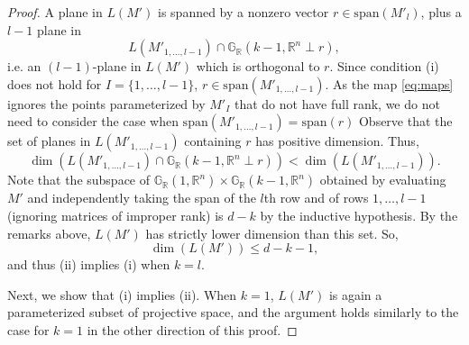 \documentclass[11pt]{article}
\newcommand{\R}{\mathbb{R}}
\newcommand{\Grall}{\mathbb{G}_{\R}}
\renewcommand\vec[1]{\overrightarrow{#1}}
\theoremstyle{remark}
\theoremstyle{definition}
\begin{document}
\begin{appendices}
\begin{proof}
A plane in $L(M')$ is spanned by a nonzero vector $r \in  \mathrm{span}(M'_{l})$, plus a $l-1$ plane in
\begin{displaymath}
L(M'_{1,\dots,l-1}) \cap \Grall(k-1, \mathbb{R}^n \perp r),
\end{displaymath}
i.e.  an $(l-1)$-plane in $L(M')$ which is orthogonal to $r$.
Since condition (i) does not hold for $I = \{1,\dots,l-1\}$, $r \in \mathrm{span}(M'_{1, \dots, l-1})$. As the map \eqref{eq:maps} ignores the points parameterized by $M'_I$ that do not have full rank, we do not need to consider the case when $\mathrm{span}(M'_{1,\dots,l-1}) = \mathrm{span}(r)$ Observe that  the set of planes in $L(M'_{1,\dots,l-1})$ containing $r$ has positive dimension.
Thus,
% 
\begin{displaymath}
\dim(L(M'_{1,\dots,l-1}) \cap \Grall(k-1, \mathbb{R}^n \perp r)) < \dim(L(M'_{1,\dots,l-1})). 
\end{displaymath}
%
\noindent
Note that the subspace of $\Grall(1,\mathbb{R}^n) \times \Grall(k-1, \mathbb{R}^n)$ obtained by evaluating $M'$ and independently taking the span of the $l$th row and of rows $1, \dots, l-1$ (ignoring matrices of improper rank) is $d-k$ by the inductive hypothesis. By the remarks above, $L(M')$ has strictly lower dimension than this set. So,
%
\begin{displaymath}
\dim(L(M')) \leq  d -k - 1,
\end{displaymath}
%
\noindent
and thus (ii) implies (i) when $k = l$.

Next, we show that (i) implies (ii). When $k = 1$, $L(M')$ is again a parameterized subset of projective space, and the argument holds similarly to the case for $k=1$ in the other direction of this proof. 


\end{proof}
\end{appendices}
\end{document}
